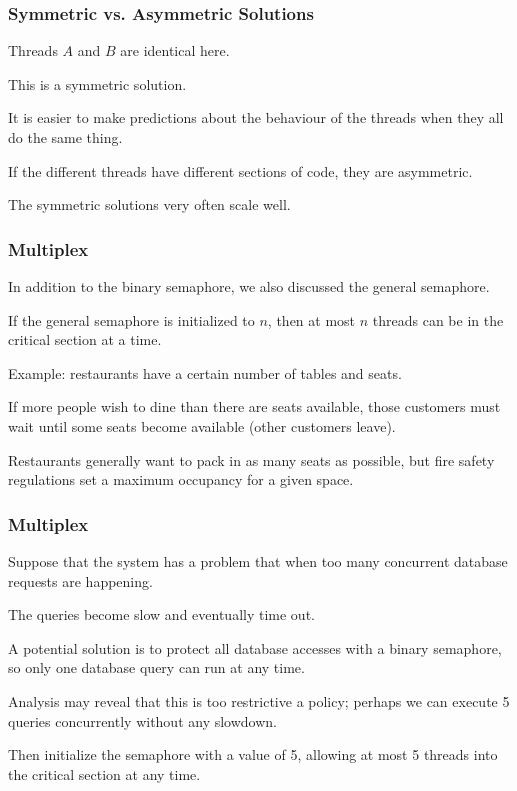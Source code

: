 \begin{frame}
	\frametitle{Symmetric vs. Asymmetric Solutions}

	Threads $A$ and $B$ are identical here.

	This is a \alert{symmetric} solution.

	It is easier to make predictions about the behaviour of the threads when they all do the same thing.

	If the different threads have different sections of code, they are \alert{asymmetric}.

	The symmetric solutions very often scale well.


\end{frame}

\begin{frame}
	\frametitle{Multiplex}
	In addition to the binary semaphore, we also discussed the general semaphore.

	If the general semaphore is initialized to $n$, then at most $n$ threads can be in the critical section at a time.

	Example: restaurants have a certain number of tables and seats.

	If more people wish to dine than there are seats available, those customers must wait until some seats become available (other customers leave).

	Restaurants generally want to pack in as many seats as possible, but fire safety regulations set a maximum occupancy for a given space.

\end{frame}

\begin{frame}
	\frametitle{Multiplex}

	Suppose that the system has a problem that when too many concurrent database requests are happening.

	The queries become slow and eventually time out.

	A potential solution is to protect all database accesses with a binary semaphore, so only one database query can run at any time.

	Analysis may reveal that this is too restrictive a policy; perhaps we can execute 5 queries concurrently without any slowdown.

	Then initialize the semaphore with a value of 5, allowing at most 5 threads into the critical section at any time.


\end{frame}

